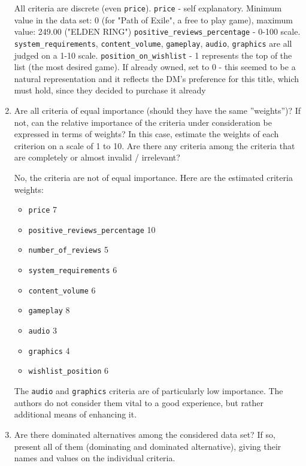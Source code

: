 \documentclass{article}
\begin{document}
\begin{enumerate}
    All criteria are discrete (even \verb|price|).
    \verb|price| - self explanatory. Minimum value in the data set: 0 (for "Path of Exile", a free to play game), maximum value: 249.00 ("ELDEN RING")
    \verb|positive_reviews_percentage| - 0-100 scale.
    \verb|system_requirements|, \verb|content_volume|, \verb|gameplay|, \verb|audio|, \verb|graphics| are all judged on a 1-10 scale.
    \verb|position_on_wishlist| - 1 represents the top of the list (the most desired game). If already owned, set to 0 - this seemed to be a natural representation and it reflects the DM's preference for this title, which must hold, since they decided to purchase it already


    \item Are all criteria of equal importance (should they have the same ”weights”)? If not, can the relative
    importance of the criteria under consideration be expressed in terms of weights? In this case, estimate
    the weights of each criterion on a scale of 1 to 10. Are there any criteria among the criteria that are
    completely or almost invalid / irrelevant?

    No, the criteria are not of equal importance. Here are the estimated criteria weights:
    \begin{itemize}
        \item \verb|price| 7
        \item \verb|positive_reviews_percentage| 10
        \item \verb|number_of_reviews| 5
        \item \verb|system_requirements| 6
        \item \verb|content_volume| 6
        \item \verb|gameplay| 8
        \item \verb|audio| 3
        \item \verb|graphics| 4
        \item \verb|wishlist_position| 6
    \end{itemize}

    The \verb|audio| and \verb|graphics| criteria are of particularly low importance. The authors do not consider them vital to a good experience, but rather additional means of enhancing it.

    \item Are there dominated alternatives among the considered data set? If so, present all of them (dominating
    and dominated alternative), giving their names and values on the individual criteria.


\end{enumerate}
\end{document}

